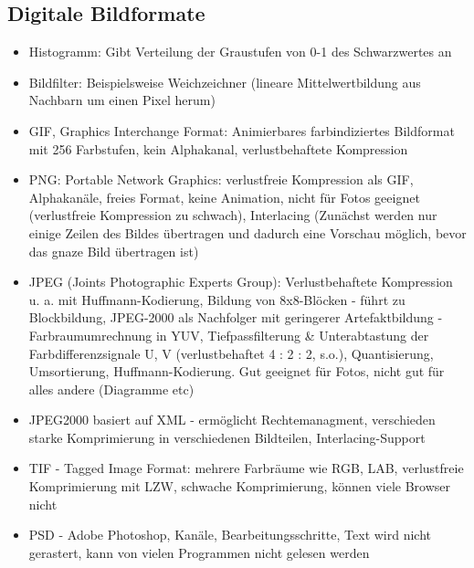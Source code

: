 \documentclass[12pt,landscape]{article}
\begin{document}
\begin{multicols}{3}
\subsection{Digitale Bildformate}
\begin{itemize}
\item Histogramm: Gibt Verteilung der Graustufen von 0-1 des Schwarzwertes an
\item Bildfilter: Beispielsweise Weichzeichner (lineare Mittelwertbildung aus Nachbarn um einen Pixel herum)
\item GIF, Graphics Interchange Format: Animierbares farbindiziertes Bildformat mit 256 Farbstufen, kein Alphakanal, verlustbehaftete Kompression
\item PNG: Portable Network Graphics: verlustfreie Kompression als GIF, Alphakanäle, freies Format, keine Animation, nicht für Fotos geeignet (verlustfreie Kompression zu schwach), Interlacing (Zunächst werden nur einige Zeilen des Bildes übertragen und dadurch eine Vorschau möglich, bevor das gnaze Bild übertragen ist)
\item JPEG (Joints Photographic Experts Group): Verlustbehaftete Kompression u. a. mit Huffmann-Kodierung, Bildung von 8x8-Blöcken - führt zu Blockbildung, JPEG-2000 als Nachfolger mit geringerer Artefaktbildung - Farbraumumrechnung in YUV, Tiefpassfilterung \& Unterabtastung der Farbdifferenzsignale U, V (verlustbehaftet 4 : 2 : 2, s.o.), Quantisierung, Umsortierung, Huffmann-Kodierung. Gut geeignet für Fotos, nicht gut für alles andere (Diagramme etc)
\item JPEG2000 basiert auf XML - ermöglicht Rechtemanagment, verschieden starke Komprimierung in verschiedenen Bildteilen, Interlacing-Support
\item TIF - Tagged Image Format: mehrere Farbräume wie RGB, LAB, verlustfreie Komprimierung mit LZW, schwache Komprimierung, können viele Browser nicht
\item PSD - Adobe Photoshop, Kanäle, Bearbeitungsschritte, Text wird nicht gerastert, kann von vielen Programmen nicht gelesen werden
\end{itemize}

\end{multicols}
\end{document}
